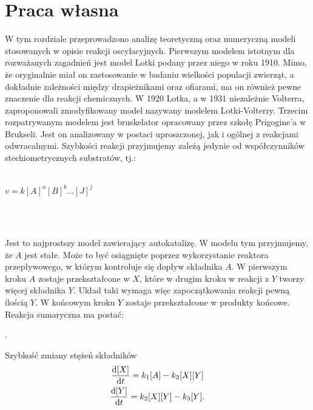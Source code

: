 \documentclass[10pt, a4paper, twoside, onecolumn]{article}
\numberwithin{equation}{section}
\begin{document}
	\section{Praca własna}
	W tym rozdziale przeprowadzono analizę teoretyczną oraz numeryczną modeli stosowanych w opisie reakcji oscylacyjnych. Pierwszym modelem istotnym dla rozważanych zagadnień jest model Lotki podany przez niego w roku 1910. Mimo, że oryginalnie miał on zastosowanie w badaniu wielkości populacji zwierząt, a dokładnie zależności między drapieżnikami oraz ofiarami, ma on również pewne znaczenie dla reakcji chemicznych. W 1920 Lotka, a w 1931 niezależnie Volterra, zaproponowali zmodyfikowany model nazywany modelem Lotki-Volterry. Trzecim rozpatrywanym modelem jest bruskelator opracowany przez szkołę Prigogine'a w Brukseli. Jest on analizowany w postaci uproszczonej, jak i ogólnej z reakcjami odwracalnymi. Szybkości reakcji przyjmujemy zależą jedynie od współczynników stechiometrycznych substratów, tj.:
	\begin{center}
		 \\
		\(v = k[A]^{a}[B]^{b}\ldots[J]^{j}\)
	\end{center}
	\begin{center}
		 \\
		 \\
	\end{center}
	Jest to najprostszy model zawierający autokatalizę. W modelu tym przyjmujemy, że \(A\) jest stałe. Może to być osiągnięte poprzez wykorzystanie reaktora przepływowego, w którym kontroluje się dopływ składnika \(A\). W pierwszym kroku \(A\) zostaje przekształcone w \(X\), które w drugim kroku w reakcji z \(Y\) tworzy więcej składnika \(Y\). Układ taki wymaga więc zapoczątkowania reakcji pewną ilością \(Y\). W końcowym kroku \(Y\) zostaje przekształcone w produkty końcowe. Reakcja sumaryczna ma postać:
	\begin{center}
		.
	\end{center}
	Szybkość zmiany stężeń składników 
	\begin{gather}
		\dv{[X]}{t}=k_{1}[A]-k_{2}[X][Y] \\
		\dv{[Y]}{t}=k_{2}[X][Y]-k_{3}[Y].
	\end{gather}
\end{document}
